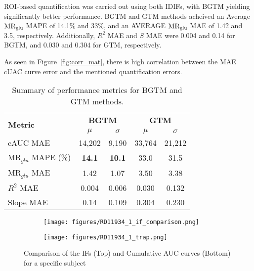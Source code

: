 ROI‐based quantification was carried out using both IDIFs, with BGTM yielding significantly better performance. BGTM and GTM methods acheived an Average \(\text{MR}_{\text{glu}}\) MAPE of 14.1\% and 33\%, and an AVERAGE \(\text{MR}_{\text{glu}}\) MAE of 1.42 and 3.5, respectively.
Additionally, \(R^2\) MAE and \(S\) MAE were 0.004 and 0.14 for BGTM, and 0.030 and 0.304 for GTM, respectively.

As seen in Figure~\ref{fig:corr_mat}, there is high correlation between the MAE cUAC curve error and the mentioned quantification errors. 

\begin{table}
	\centering
	\begin{tabular}{l|cc|cc}
		\toprule
		\multirow{2}{*}{\textbf{Metric}} & \multicolumn{2}{c|}{\textbf{BGTM}} & \multicolumn{2}{c}{\textbf{GTM}}                        \\
		\cmidrule(lr){2-3} \cmidrule(lr){4-5}
		                                 & \(\mu\)                            & \(\sigma\)                       & \(\mu\) & \(\sigma\) \\
		\midrule
		cAUC MAE                         & 14,202                             & 9,190                            & 33,764  & 21,212     \\
		\(\textrm{MR}_{glu}\) MAPE (\%)  & \textbf{14.1}                      & \textbf{10.1}                    & 33.0    & 31.5       \\
		\(\textrm{MR}_{glu}\) MAE        & 1.42                               & 1.07                             & 3.50    & 3.38       \\
		\(R^2\) MAE                      & 0.004                              & 0.006                            & 0.030   & 0.132      \\
		Slope MAE                        & 0.14                               & 0.109                            & 0.304   & 0.230      \\
		\bottomrule
	\end{tabular}
	\caption{Summary of performance metrics for BGTM and GTM methods.}
	\label{tab:metrics}
\end{table}

\begin{figure}
	\centering
	\begin{subfigure}{\textwidth}
		\texttt{[image: figures/RD11934\_1\_if\_comparison.png]}
		\label{subfig:if_compare}
	\end{subfigure}
	\begin{subfigure}{\textwidth}
		\texttt{[image: figures/RD11934\_1\_trap.png]}
		\label{subfig:trap_compare}
	\end{subfigure}
	\label{fig:ifs}
	\caption{Comparison of the IFs (Top) and Cumulative AUC curves (Bottom) for a specific subject}
\end{figure}




